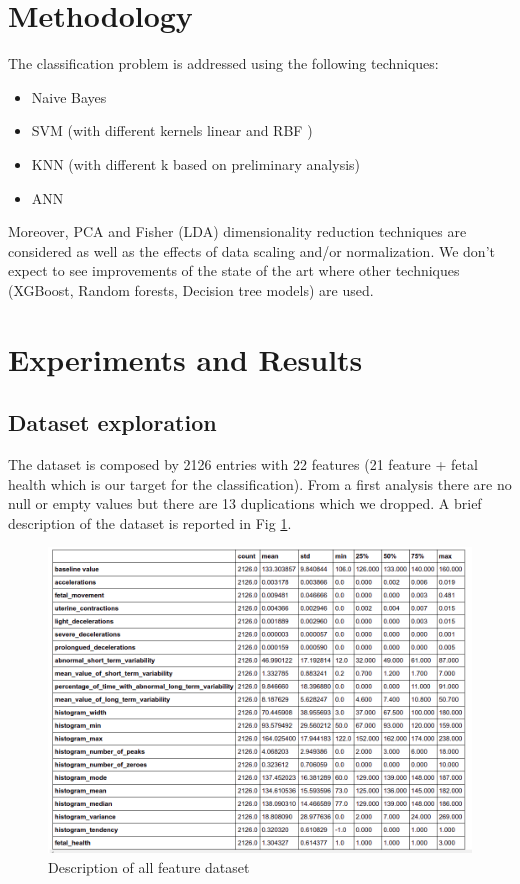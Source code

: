 \documentclass[a4paper,12pt]{article}
\begin{document}
\section{Methodology}
The classification problem is addressed using the following techniques:

\begin{itemize}
  \item Naive Bayes \cite{ml}
  \item SVM (with different kernels linear and RBF ) \cite{ml}
  \item KNN (with different k based on preliminary analysis) \cite{ml}
  \item ANN \cite{ann}
\end{itemize}
Moreover, PCA and Fisher (LDA) dimensionality reduction techniques are considered as well as the effects of data scaling and/or normalization. We don't expect to see improvements of the state of the art where other techniques (XGBoost, Random forests, Decision tree models) are used.

\section{Experiments and Results}
\subsection{Dataset exploration}
The dataset is composed by 2126 entries with 22 features (21 feature + fetal health which is our target for the classification). From a first analysis there are no null or empty values but there are 13 duplications which we dropped. A brief description of the dataset is reported in Fig \ref{fig:features}.

\begin{figure}[H]
\begin{center}
\includegraphics[width=1.0\textwidth]{images/features.png}
\end{center}
\caption{Description of all feature dataset}
\label{fig:features}
\end{figure}
\end{document}
